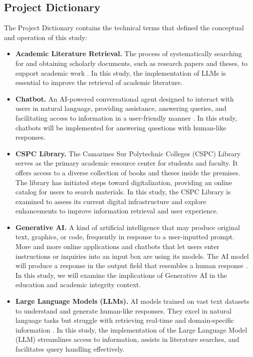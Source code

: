 \begin{refsection}
\section{Project Dictionary}

The Project Dictionary contains the technical terms that defined the conceptual and operation of this study:

\begin{itemize}
    \item \textbf{Academic Literature Retrieval.} The process of systematically searching for and obtaining scholarly documents, such as research papers and theses, to support academic work \cite{sallam2023chatgpt}. In this study, the implementation of LLMs is essential to improve the retrieval of academic literature.
    \item \textbf{Chatbot.} An AI-powered conversational agent designed to interact with users in natural language, providing assistance, answering queries, and facilitating access to information in a user-friendly manner \cite{chow2023developing}. In this study, chatbots will be implemented for answering questions with human-like responses.
    \item \textbf{CSPC Library.} The Camarines Sur Polytechnic Colleges (CSPC) Library serves as the primary academic resource center for students and faculty. It offers access to a diverse collection of books and theses inside the premises. The library has initiated steps toward digitalization, providing an online catalog for users to search materials. In this study, the CSPC Library is examined to assess its current digital infrastructure and explore enhancements to improve information retrieval and user experience.
    \item \textbf{Generative AI.} A kind of artificial intelligence that may produce original text, graphics, or code, frequently in response to a user-inputted prompt. More and more online applications and chatbots that let users enter instructions or inquiries into an input box are using its models. The AI model will produce a response in the output field that resembles a human response \cite{bozkurt2024genai}. In this study, we will examine the implications of Generative AI in the education and academic integrity context.
    \item \textbf{Large Language Models (LLMs).} AI models trained on vast text datasets to understand and generate human-like responses. They excel in natural language tasks but struggle with retrieving real-time and domain-specific information \cite{klang2024advancing}. In this study, the implementation of the Large Language Model (LLM) streamlines access to information, assists in literature searches, and facilitates query handling effectively.

\end{itemize}
\end{refsection}
